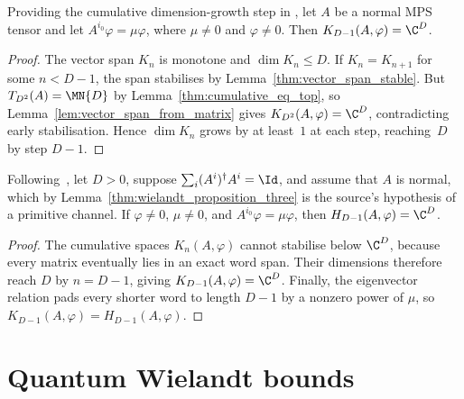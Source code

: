\begin{lemma}\label{thm:eigenvector_spreading}
    \leanok
    Providing the cumulative dimension-growth step in
    \cite[Lemma~2(a)]{Sanz2010Quantum}, let $A$ be a normal MPS tensor and let
    $A^{i_0}\varphi=\mu\varphi$, where $\mu\neq0$ and $\varphi\neq0$.
    Then $K_{D-1}(A,\varphi)=\C^D$.
\end{lemma}

\begin{proof}
    \leanok
    The vector span $K_n$ is monotone and $\dim K_n\le D$.
    If $K_n=K_{n+1}$ for some $n<D-1$, the span stabilises by
    Lemma~\ref{thm:vector_span_stable}.
    But $T_{D^2}(A)=\MN{D}$ by Lemma~\ref{thm:cumulative_eq_top}, so
    Lemma~\ref{lem:vector_span_from_matrix} gives
    $K_{D^2}(A,\varphi)=\C^D$, contradicting early stabilisation.
    Hence $\dim K_n$ grows by at least~$1$ at each step, reaching~$D$ by
    step $D-1$.
\end{proof}


\begin{lemma}
    \label{thm:eigenvector_spreading_primitive}
    \leanok
    Following~\cite[Lemma~2(a)]{Sanz2010Quantum}, let $D>0$, suppose
    $\sum_i(A^i)^\dagger A^i=\Id$, and assume that $A$ is normal, which by
    Lemma~\ref{thm:wielandt_proposition_three} is the source's hypothesis
    of a primitive channel. If $\varphi\neq0$,
    $\mu\neq0$, and $A^{i_0}\varphi=\mu\varphi$, then
    $H_{D-1}(A,\varphi)=\C^D$.
\end{lemma}

\begin{proof}\leanok
    The cumulative spaces $K_n(A,\varphi)$ cannot
    stabilise below $\C^D$, because every matrix eventually lies in an exact
    word span. Their dimensions therefore reach $D$ by $n=D-1$, giving
    $K_{D-1}(A,\varphi)=\C^D$. Finally, the eigenvector relation pads every
    shorter word to length $D-1$ by a nonzero power of $\mu$, so
    $K_{D-1}(A,\varphi)=H_{D-1}(A,\varphi)$.
\end{proof}

\section{Quantum Wielandt bounds}

